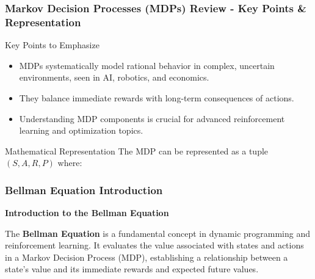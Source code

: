\documentclass[aspectratio=169]{beamer}
\begin{document}
\begin{frame}[fragile]
    \frametitle{Markov Decision Processes (MDPs) Review - Key Points & Representation}
    \begin{block}{Key Points to Emphasize}
        \begin{itemize}
            \item MDPs systematically model rational behavior in complex, uncertain environments, seen in AI, robotics, and economics.
            \item They balance immediate rewards with long-term consequences of actions.
            \item Understanding MDP components is crucial for advanced reinforcement learning and optimization topics.
        \end{itemize}
    \end{block}

    \begin{block}{Mathematical Representation}
        The MDP can be represented as a tuple $(S, A, R, P)$ where:
    \end{block}
\end{frame}

\begin{frame}[fragile]
    \frametitle{Bellman Equation Introduction}
    \textbf{Introduction to the Bellman Equation}

    The \textbf{Bellman Equation} is a fundamental concept in dynamic programming and reinforcement learning. It evaluates the value associated with states and actions in a Markov Decision Process (MDP), establishing a relationship between a state’s value and its immediate rewards and expected future values.
\end{frame}
\end{document}
